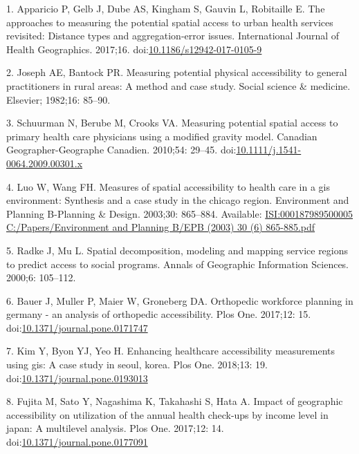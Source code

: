 \documentclass[10pt,letterpaper]{article}
\begin{document}
\hypertarget{refs}{}
\hypertarget{ref-Apparicio2017}{}
1. Apparicio P, Gelb J, Dube AS, Kingham S, Gauvin L, Robitaille E. The
approaches to measuring the potential spatial access to urban health
services revisited: Distance types and aggregation-error issues.
International Journal of Health Geographics. 2017;16.
doi:\href{https://doi.org/10.1186/s12942-017-0105-9}{10.1186/s12942-017-0105-9}

\hypertarget{ref-Joseph1982}{}
2. Joseph AE, Bantock PR. Measuring potential physical accessibility to
general practitioners in rural areas: A method and case study. Social
science \& medicine. Elsevier; 1982;16: 85--90.

\hypertarget{ref-Schuurman2010}{}
3. Schuurman N, Berube M, Crooks VA. Measuring potential spatial access
to primary health care physicians using a modified gravity model.
Canadian Geographer-Geographe Canadien. 2010;54: 29--45.
doi:\href{https://doi.org/10.1111/j.1541-0064.2009.00301.x}{10.1111/j.1541-0064.2009.00301.x}

\hypertarget{ref-Luo2003}{}
4. Luo W, Wang FH. Measures of spatial accessibility to health care in a
gis environment: Synthesis and a case study in the chicago region.
Environment and Planning B-Planning \& Design. 2003;30: 865--884.
Available:
\href{ISI:000187989500005\%0AC:/Papers/Environment\%20and\%20Planning\%20B/EPB\%20(2003)\%2030\%20(6)\%20865-885.pdf}{ISI:000187989500005
C:/Papers/Environment and Planning B/EPB (2003) 30 (6) 865-885.pdf}

\hypertarget{ref-Radke2000}{}
5. Radke J, Mu L. Spatial decomposition, modeling and mapping service
regions to predict access to social programs. Annals of Geographic
Information Sciences. 2000;6: 105--112.

\hypertarget{ref-Bauer2017}{}
6. Bauer J, Muller P, Maier W, Groneberg DA. Orthopedic workforce
planning in germany - an analysis of orthopedic accessibility. Plos One.
2017;12: 15.
doi:\href{https://doi.org/10.1371/journal.pone.0171747}{10.1371/journal.pone.0171747}

\hypertarget{ref-Kim2018}{}
7. Kim Y, Byon YJ, Yeo H. Enhancing healthcare accessibility
measurements using gis: A case study in seoul, korea. Plos One. 2018;13:
19.
doi:\href{https://doi.org/10.1371/journal.pone.0193013}{10.1371/journal.pone.0193013}

\hypertarget{ref-Fujita2017}{}
8. Fujita M, Sato Y, Nagashima K, Takahashi S, Hata A. Impact of
geographic accessibility on utilization of the annual health check-ups
by income level in japan: A multilevel analysis. Plos One. 2017;12: 14.
doi:\href{https://doi.org/10.1371/journal.pone.0177091}{10.1371/journal.pone.0177091}
\end{document}
